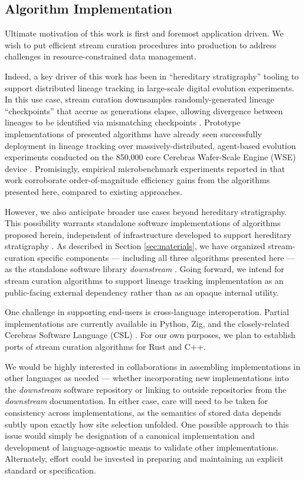 \subsection{Algorithm Implementation}

Ultimate motivation of this work is first and foremost application driven.
We wish to put efficient stream curation procedures into production to address challenges in resource-constrained data management.

Indeed, a key driver of this work has been in ``hereditary stratigraphy'' tooling to support distributed lineage tracking in large-scale digital evolution experiments.
In this use case, stream curation downsamples randomly-generated lineage ``checkpoints'' that accrue as generations elapse, allowing divergence between lineages to be identified via mismatching checkpoints \citep{moreno2022hereditary}.
Prototype implementations of presented algorithms have already seen successfully deployment in lineage tracking over massively-distributed, agent-based evolution experiments conducted on the 850,000 core Cerebras Wafer-Scale Engine (WSE) device \citep{moreno2024trackable}.
Promisingly, empirical microbenchmark experiments reported in that work corroborate order-of-magnitude efficiency gains from the algorithms presented here, compared to existing approaches.

However, we also anticipate broader use cases beyond hereditary stratigraphy.
This possibility warrants standalone software implementations of algorithms proposed herein, independent of infrastructure developed to support hereditary stratigraphy \citep{moreno2022hstrat}.
As described in Section \ref{sec:materials}, we have organized stream-curation specific components --- including all three algorithms presented here --- as the standalone software library \textit{downstream} \citep{moreno2024downstream}.
Going forward, we intend for stream curation algorithms to support lineage tracking implementation as an public-facing external dependency rather than as an opaque internal utility.

One challenge in supporting end-users is cross-language interoperation.
Partial implementations are currently available in Python, Zig, and the closely-related Cerebras Software Language (CSL) \citep{moreno2024hsurf,moreno2024downstream,moreno2024wse}.
For our own purposes, we plan to establish ports of stream curation algorithms for Rust and C++.

We would be highly interested in collaborations in assembling implementations in other languages as needed --- whether incorporating new implementations into the \textit{downstream} software repository or linking to outside repositories from the \textit{downstream} documentation.
In either case, care will need to be taken for consistency across implementations, as the semantics of stored data depends subtly upon exactly how site selection unfolded.
One possible approach to this issue would simply be designation of a canonical implementation and development of language-agnostic means to validate other implementations.
Alternately, effort could be invested in preparing and maintaining an explicit standard or specification.
